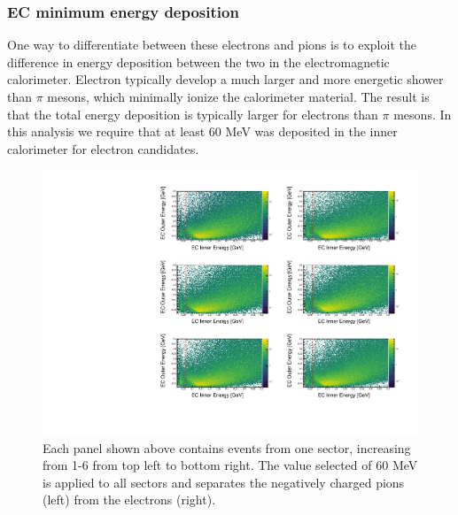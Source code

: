 
\subsubsection*{EC minimum energy deposition}
One way to differentiate between these electrons and pions is to exploit the difference in energy deposition between the two in the electromagnetic calorimeter.  Electron typically develop a much larger and more energetic shower than $\pi$ mesons, which minimally ionize the calorimeter material.  The result is that the total energy deposition is typically larger for electrons than $\pi$ mesons.  In this analysis we require that at least 60 MeV was deposited in the inner calorimeter for electron candidates.  

\begin{figure}
	\centering
	\label{fig:ec-edep}
	\includegraphics[width=\textwidth]{image/plots/electron-id/summary-ec-edep.pdf}
	\caption{Each panel shown above contains events from one sector, increasing from 1-6 from top left to bottom right.  The value selected of 60 MeV is applied to all sectors and separates the negatively charged pions (left) from the electrons (right).}
\end{figure}

